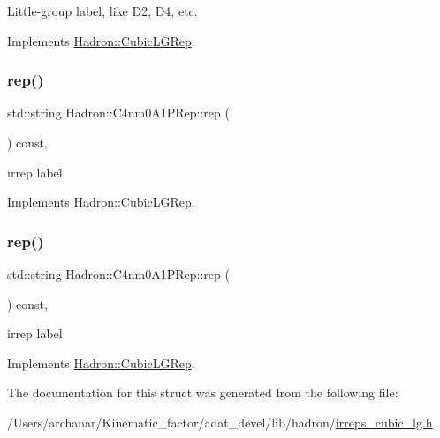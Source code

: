 Little-\/group label, like D2, D4, etc. 

Implements \mbox{\hyperlink{structHadron_1_1CubicLGRep_a9bdb14b519a611d21379ed96a3a9eb41}{Hadron\+::\+Cubic\+L\+G\+Rep}}.

\mbox{\label{structHadron_1_1C4nm0A1PRep_a16776c5723a87d39dce0e2c58297413f}} 
\subsubsection{\texorpdfstring{rep()}{rep()}\hspace{0.1cm}{\footnotesize\ttfamily [1/2]}}
{\footnotesize\ttfamily std\+::string Hadron\+::\+C4nm0\+A1\+P\+Rep\+::rep (\begin{DoxyParamCaption}{ }\end{DoxyParamCaption}) const\hspace{0.3cm}{\ttfamily [inline]}, {\ttfamily [virtual]}}

irrep label 

Implements \mbox{\hyperlink{structHadron_1_1CubicLGRep_a50f5ddbb8f4be4cee0106fa9e8c75e6c}{Hadron\+::\+Cubic\+L\+G\+Rep}}.

\mbox{\label{structHadron_1_1C4nm0A1PRep_a16776c5723a87d39dce0e2c58297413f}} 
\subsubsection{\texorpdfstring{rep()}{rep()}\hspace{0.1cm}{\footnotesize\ttfamily [2/2]}}
{\footnotesize\ttfamily std\+::string Hadron\+::\+C4nm0\+A1\+P\+Rep\+::rep (\begin{DoxyParamCaption}{ }\end{DoxyParamCaption}) const\hspace{0.3cm}{\ttfamily [inline]}, {\ttfamily [virtual]}}

irrep label 

Implements \mbox{\hyperlink{structHadron_1_1CubicLGRep_a50f5ddbb8f4be4cee0106fa9e8c75e6c}{Hadron\+::\+Cubic\+L\+G\+Rep}}.



The documentation for this struct was generated from the following file\+:\begin{DoxyCompactItemize}
\item 
/\+Users/archanar/\+Kinematic\+\_\+factor/adat\+\_\+devel/lib/hadron/\mbox{\hyperlink{lib_2hadron_2irreps__cubic__lg_8h}{irreps\+\_\+cubic\+\_\+lg.\+h}}\end{DoxyCompactItemize}
